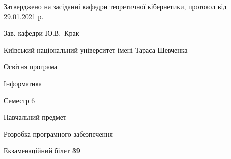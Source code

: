 \documentclass[10pt, ukrainian]{article}
\begin{document}
{\vspace{5mm}\smallskip \begin {small} Затверджено на засіданні кафедри теоретичної кібернетики, протокол  від   29.01.2021 р.\par\smallskip\smallskip
{\parbox {6.5 cm}{Зав. кафедри \dotfill Ю.В.~Крак}} \end{small}}
\newpage

{{\begin {small}\par
{ \center  Київський національний університет імені Тараса Шевченка \par}
{\parbox {5 cm}{Освітня програма \hfill}{\parbox {7 cm}{Інформатика \hfill}}\parbox {6 cm}{\hfill Семестр 6}}\par
{\parbox {5 cm} {Навчальний предмет \hfill}\parbox {7 cm}{Розробка програмного забезпечення \hfill}\parbox {6cm}{\hfill}\par}\vspace{-7pt} \end{small}}{\center Екзаменаційний білет \No \textbf
{ 39 }\par}}
\end{document}

